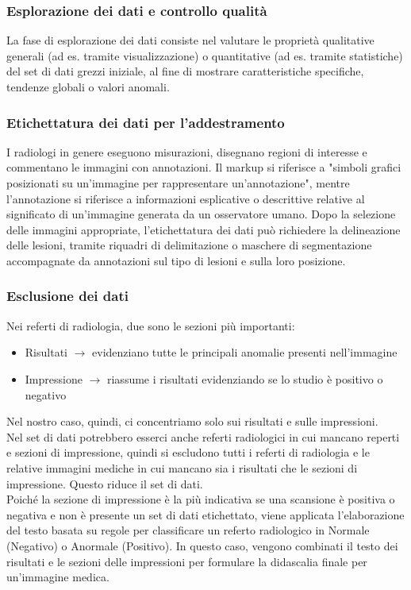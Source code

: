 \documentclass[12pt,a4paper]{report}
\begin{document}
\subsubsection{Esplorazione dei dati e controllo qualità}
La fase di esplorazione dei dati consiste nel valutare le proprietà qualitative generali (ad es. tramite visualizzazione) o quantitative (ad es. tramite statistiche) del set di dati grezzi iniziale, al fine di mostrare caratteristiche specifiche, tendenze globali o valori anomali.

\subsubsection{Etichettatura dei dati per l'addestramento}
I radiologi in genere eseguono misurazioni, disegnano regioni di interesse e commentano le immagini con annotazioni. Il markup si riferisce a "simboli grafici posizionati su un'immagine per rappresentare un'annotazione", mentre l'annotazione si riferisce a informazioni esplicative o descrittive relative al significato di un'immagine generata da un osservatore umano.
Dopo la selezione delle immagini appropriate, l'etichettatura dei dati può richiedere la delineazione delle lesioni, tramite riquadri di delimitazione o maschere di segmentazione accompagnate da annotazioni sul tipo di lesioni e sulla loro posizione.

\subsubsection{Esclusione dei dati}
Nei referti di radiologia, due sono le sezioni più importanti:
\begin{itemize}
    \item Risultati $\rightarrow$ evidenziano tutte le principali anomalie presenti nell'immagine
    \item Impressione $\rightarrow$ riassume i risultati evidenziando se lo studio è positivo o negativo
\end{itemize}
Nel nostro caso, quindi, ci concentriamo solo sui risultati e sulle impressioni.\\
Nel set di dati potrebbero esserci anche referti radiologici in cui mancano reperti e sezioni di impressione, quindi si escludono tutti i referti di radiologia e le relative immagini mediche in cui mancano sia i risultati che le sezioni di impressione. Questo riduce il set di dati.\\
Poiché la sezione di impressione è la più indicativa se una scansione è positiva o negativa e non è presente un set di dati etichettato, viene applicata l'elaborazione del testo basata su regole per classificare un referto radiologico in Normale (Negativo) o Anormale (Positivo).
In questo caso, vengono combinati il testo dei risultati e le sezioni delle impressioni per formulare la didascalia finale per un'immagine medica.
\end{document}
